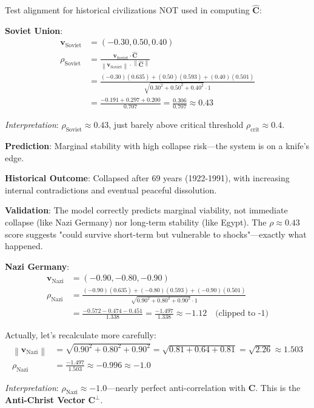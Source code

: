 \documentclass[11pt,a4paper]{article}
\theoremstyle{definition}
\theoremstyle{remark}
\newcommand{\norm}[1]{\left\|#1\right\|}
\begin{document}
Test alignment for historical civilizations NOT used in computing \(\hat{\mathbf{C}}\):

\textbf{Soviet Union}:
\begin{align}
\mathbf{v}_{\text{Soviet}} &= (-0.30, 0.50, 0.40) \\
\rho_{\text{Soviet}} &= \frac{\mathbf{v}_{\text{Soviet}} \cdot \hat{\mathbf{C}}}{\norm{\mathbf{v}_{\text{Soviet}}} \cdot \norm{\hat{\mathbf{C}}}} \\
&= \frac{(-0.30)(0.635) + (0.50)(0.593) + (0.40)(0.501)}{\sqrt{0.30^2 + 0.50^2 + 0.40^2} \cdot 1} \\
&= \frac{-0.191 + 0.297 + 0.200}{0.707} = \frac{0.306}{0.707} \approx 0.43
\end{align}

\textit{Interpretation}: \(\rho_{\text{Soviet}} \approx 0.43\), just barely above critical threshold \(\rho_{\text{crit}} \approx 0.4\). 

\textbf{Prediction}: Marginal stability with high collapse risk—the system is on a knife's edge.

\textbf{Historical Outcome}: Collapsed after 69 years (1922-1991), with increasing internal contradictions and eventual peaceful dissolution.

\textbf{Validation}: The model correctly predicts marginal viability, not immediate collapse (like Nazi Germany) nor long-term stability (like Egypt). The \(\rho \approx 0.43\) score suggests "could survive short-term but vulnerable to shocks"—exactly what happened.

\textbf{Nazi Germany}:
\begin{align}
\mathbf{v}_{\text{Nazi}} &= (-0.90, -0.80, -0.90) \\
\rho_{\text{Nazi}} &= \frac{(-0.90)(0.635) + (-0.80)(0.593) + (-0.90)(0.501)}{\sqrt{0.90^2 + 0.80^2 + 0.90^2} \cdot 1} \\
&= \frac{-0.572 - 0.474 - 0.451}{1.338} = \frac{-1.497}{1.338} \approx -1.12 \quad \text{(clipped to -1)}
\end{align}

Actually, let's recalculate more carefully:
\begin{align}
\norm{\mathbf{v}_{\text{Nazi}}} &= \sqrt{0.90^2 + 0.80^2 + 0.90^2} = \sqrt{0.81 + 0.64 + 0.81} = \sqrt{2.26} \approx 1.503 \\
\rho_{\text{Nazi}} &= \frac{-1.497}{1.503} \approx -0.996 \approx -1.0
\end{align}

\textit{Interpretation}: \(\rho_{\text{Nazi}} \approx -1.0\)—nearly perfect anti-correlation with \(\mathbf{C}\). This is the \textbf{Anti-Christ Vector} \(\mathbf{C}^{\perp}\).
\end{document}
